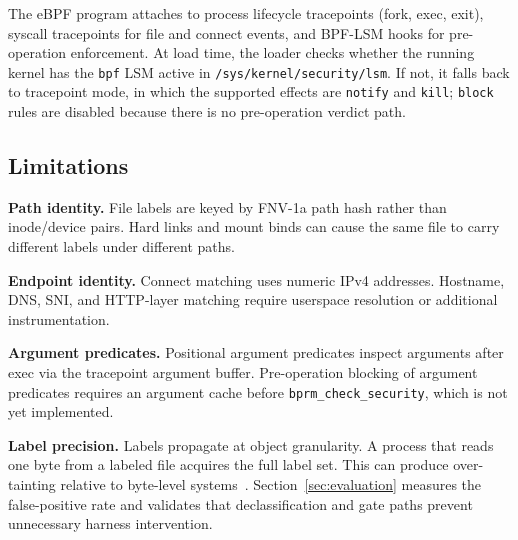 The eBPF program attaches to process lifecycle tracepoints (fork, exec,
exit), syscall tracepoints for file and connect events, and BPF-LSM hooks
for pre-operation enforcement. At load time, the loader checks whether the
running kernel has the \texttt{bpf} LSM active in
\texttt{/sys/kernel/security/lsm}. If not, it falls back to tracepoint
mode, in which the supported effects are \texttt{notify} and \texttt{kill};
\texttt{block} rules are disabled because there is no pre-operation verdict
path.

\subsection{Limitations}

\textbf{Path identity.} File labels are keyed by FNV-1a path hash rather
than inode/device pairs. Hard links and mount binds can cause the same
file to carry different labels under different paths.

\textbf{Endpoint identity.} Connect matching uses numeric IPv4 addresses.
Hostname, DNS, SNI, and HTTP-layer matching require userspace resolution or
additional instrumentation.

\textbf{Argument predicates.} Positional argument predicates inspect
arguments after exec via the tracepoint argument buffer. Pre-operation
blocking of argument predicates requires an argument cache before
\texttt{bprm\_check\_security}, which is not yet implemented.

\textbf{Label precision.} Labels propagate at object granularity. A process
that reads one byte from a labeled file acquires the full label set. This
can produce over-tainting relative to byte-level
systems~\cite{kemerlis2012libdft}. Section~\ref{sec:evaluation} measures the
false-positive rate and validates that declassification and gate paths
prevent unnecessary harness intervention.
